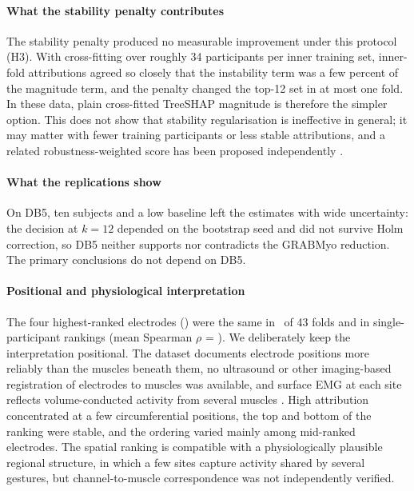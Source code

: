 \paragraph{What the stability penalty contributes}
The stability penalty produced no measurable improvement under this protocol (H3). With cross-fitting over roughly 34 participants per inner training set, inner-fold attributions agreed so closely that the instability term was a few percent of the magnitude term, and the penalty changed the top-12 set in at most one fold. In these data, plain cross-fitted TreeSHAP magnitude is therefore the simpler option. This does not show that stability regularisation is ineffective in general; it may matter with fewer training participants or less stable attributions, and a related robustness-weighted score has been proposed independently \citep{xiang2026roshap}.



\paragraph{What the replications show}
On DB5, ten subjects and a low baseline left the estimates with wide uncertainty: the decision at $k = 12$ depended on the bootstrap seed and did not survive Holm correction, so DB5 neither supports nor contradicts the GRABMyo reduction. The primary conclusions do not depend on DB5.

\paragraph{Positional and physiological interpretation}
The four highest-ranked electrodes (\TopFourSet) were the same in \TopFourFolds\ of 43 folds and in single-participant rankings (mean Spearman $\rho$ = \StabSubjRho). We deliberately keep the interpretation positional. The dataset documents electrode positions more reliably than the muscles beneath them, no ultrasound or other imaging-based registration of electrodes to muscles was available, and surface EMG at each site reflects volume-conducted activity from several muscles \citep{farina2004extraction}. High attribution concentrated at a few circumferential positions, the top and bottom of the ranking were stable, and the ordering varied mainly among mid-ranked electrodes. The spatial ranking is compatible with a physiologically plausible regional structure, in which a few sites capture activity shared by several gestures, but channel-to-muscle correspondence was not independently verified.

